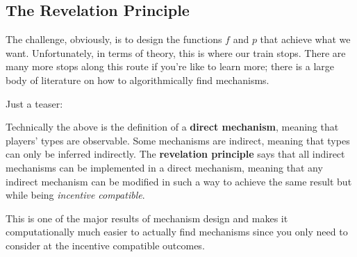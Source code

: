 \documentclass[11pt]{article}
\begin{document}




\subsection{The Revelation Principle}

The challenge, obviously, is to design the functions $f$ and $p$ that achieve what we want. Unfortunately, in terms of theory, this is where our train stops. There are many more stops along this route if you're like to learn more; there is a large body of literature on how to algorithmically find mechanisms.

Just a teaser:

Technically the above is the definition of a {\bf direct mechanism}, meaning that players' types are observable. 
Some mechanisms are indirect, meaning that types can only be inferred indirectly.
The {\bf revelation principle} says that all indirect mechanisms can be implemented in a direct mechanism, meaning that any indirect mechanism can be modified in such a way to achieve the same result but while being {\it incentive compatible}.

This is one of the major results of mechanism design and makes it computationally much easier to actually find mechanisms since you only need to consider at the incentive compatible outcomes. 
\end{document}

